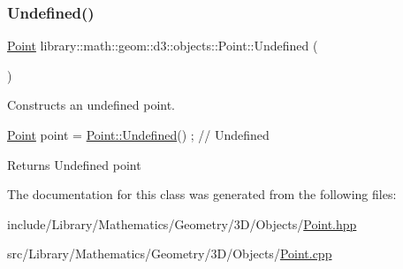 \subsubsection{\texorpdfstring{Undefined()}{Undefined()}}
{\footnotesize\ttfamily \hyperlink{classlibrary_1_1math_1_1geom_1_1d3_1_1objects_1_1_point}{Point} library\+::math\+::geom\+::d3\+::objects\+::\+Point\+::\+Undefined (\begin{DoxyParamCaption}{ }\end{DoxyParamCaption})\hspace{0.3cm}{\ttfamily [static]}}



Constructs an undefined point. 


\begin{DoxyCode}
\hyperlink{classlibrary_1_1math_1_1geom_1_1d3_1_1objects_1_1_point_a617e690ab6091af3de729cee337e309e}{Point} point = \hyperlink{classlibrary_1_1math_1_1geom_1_1d3_1_1objects_1_1_point_a7c4c9c71f9b29b85925d8a7ed4943501}{Point::Undefined}() ; \textcolor{comment}{// Undefined}
\end{DoxyCode}


\begin{DoxyReturn}{Returns}
Undefined point 
\end{DoxyReturn}


The documentation for this class was generated from the following files\+:\begin{DoxyCompactItemize}
\item 
include/\+Library/\+Mathematics/\+Geometry/3\+D/\+Objects/\hyperlink{3_d_2_objects_2_point_8hpp}{Point.\+hpp}\item 
src/\+Library/\+Mathematics/\+Geometry/3\+D/\+Objects/\hyperlink{3_d_2_objects_2_point_8cpp}{Point.\+cpp}\end{DoxyCompactItemize}
